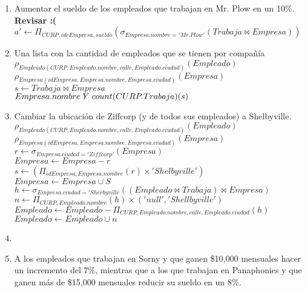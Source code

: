 \documentclass{article}
\begin{document}
\begin{enumerate}
\begin{enumerate}
				\item Aumentar el sueldo de los empleados que trabajan en Mr. Plow en un 10\%. \textbf{Revisar :(}\\ 
				
				$a' \leftarrow \Pi_{CURP, ideEmpresa, sueldo}(\sigma_{Empresa.nombre = 'Mr. Plow'}(Trabaja \bowtie Empresa))$
				
				\item Una lista con la cantidad de empleados que se tienen por compañía\\
				
				$\rho_{Empleado(CURP, Empleado.nombre, calle, Empleado.ciudad)}(Empleado)$\\
				$\rho_{Empresa(idEmpresa, Empresa.nombre, Empresa.ciudad)}(Empresa)$\\
				$s \leftarrow Trabaja \bowtie Empresa$\\
				${Empresa.nombre} \hspace{1mm} Y \hspace{1mm} {count(CURP.Trabaja)(s)}$\\
				
				\item Cambiar la ubicación de Ziffcorp (y de todos sus empleados) a Shelbyville.\\
				
				$\rho_{Empleado(CURP, Empleado.nombre, calle, Empleado.ciudad)}(Empleado)$\\
				$\rho_{Empresa(idEmpresa, Empresa.nombre, Empresa.ciudad)}(Empresa)$\\
				$r \leftarrow \sigma_{Empresa.ciudad = 'Ziffcorp'}(Empresa)$\\
				$Empresa \leftarrow Empresa - r$\\
				$s \leftarrow (\Pi_{idEmpresa, Empresa.nombre}(r) \times 'Shelbyville')$\\
				$Empresa \leftarrow Empresa \cup S$\\
				$h \leftarrow \sigma_{Empresa.ciudad = 'Sherbyville}((Empleado \bowtie Trabaja) \bowtie Empresa)$\\
				$n \leftarrow \Pi_{CURP, Empleado.nombre}(h) \times ('null', 'Shellbyville')$\\
				$Empleado \leftarrow Empleado - \Pi_{CURP, Empleado.nombre, calle, Empleado.ciudad}(h)$\\
				$Empleado \leftarrow Empleado \cup n$
				
				\item
				\item A los empleados que trabajan en Sorny y que ganen \$10,000 mensuales hacer un incremento
				del 7\%, mientras que a los que trabajan en Panaphonics y que ganen más de \$15,000
				mensuales reducir su sueldo en un 8\%.\\
				

\end{enumerate}
\end{enumerate}
\end{document}
